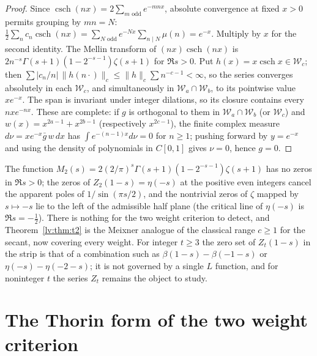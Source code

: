 \begin{proof}
Since $\operatorname{csch}(nx)=2\sum_{m\text{ odd}}e^{-mnx}$, absolute convergence at fixed $x>0$ permits grouping by $mn=N$: $\frac12\sum_nc_n\operatorname{csch}(nx)=\sum_{N\text{ odd}}e^{-Nx}\sum_{n\mid N}\mu(n)=e^{-x}$. Multiply by $x$ for the second identity. The Mellin transform of $(nx)\operatorname{csch}(nx)$ is $2n^{-s}\Gamma(s+1)(1-2^{-s-1})\zeta(s+1)$ for $\Re s>0$. Put $h(x)=x\operatorname{csch}x\in\mathcal W_c$; then $\sum|c_n/n|\,\|h(n\cdot)\|_c\le\|h\|_c\sum n^{-c-1}<\infty$, so the series converges absolutely in each $\mathcal W_c$, and simultaneously in $\mathcal W_a\cap\mathcal W_b$, to its pointwise value $xe^{-x}$. The span is invariant under integer dilations, so its closure contains every $nxe^{-nx}$. These are complete: if $g$ is orthogonal to them in $\mathcal W_a\cap\mathcal W_b$ (or $\mathcal W_c$) and $w(x)=x^{2a-1}+x^{2b-1}$ (respectively $x^{2c-1}$), the finite complex measure $d\nu=xe^{-x}\bar g\,w\,dx$ has $\int e^{-(n-1)x}d\nu=0$ for $n\ge1$; pushing forward by $y=e^{-x}$ and using the density of polynomials in $C[0,1]$ gives $\nu=0$, hence $g=0$.
\end{proof}

The function $M_2(s)=2(2/\pi)^s\Gamma(s+1)(1-2^{-s-1})\zeta(s+1)$ has no zeros in $\Re s>0$; the zeros of $Z_2(1-s)=\eta(-s)$ at the positive even integers cancel the apparent poles of $1/\sin(\pi s/2)$, and the nontrivial zeros of $\zeta$ mapped by $s\mapsto-s$ lie to the left of the admissible half plane (the critical line of $\eta(-s)$ is $\Re s=-\frac12$). There is nothing for the two weight criterion to detect, and Theorem~\ref{lv:thm:t2} is the Meixner analogue of the classical range $c\ge1$ for the secant, now covering every weight. For integer $t\ge3$ the zero set of $Z_t(1-s)$ in the strip is that of a combination such as $\beta(1-s)-\beta(-1-s)$ or $\eta(-s)-\eta(-2-s)$; it is not governed by a single $L$ function, and for noninteger $t$ the series $Z_t$ remains the object to study.

\section{The Thorin form of the two weight criterion}\label{lv:sec:thorinform}

